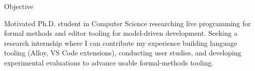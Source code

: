 \begin{rSection}{Objective}

    Motivated Ph.D. student in Computer Science researching live programming for formal methods and editor tooling for model-driven development. Seeking a research internship where I can contribute my experience building language tooling (Alloy, VS Code extensions), conducting user studies, and developing experimental evaluations to advance usable formal-methods tooling.

\end{rSection}
